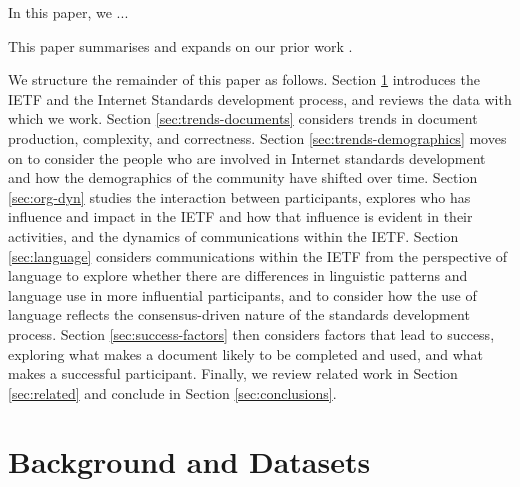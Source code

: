 \documentclass[twocolumn,10pt]{article}
\begin{document}
In this paper, we ...



This paper summarises and expands on our prior work
\cite{mcquistin:2021:characterising,khare:2022:web-we-weave,
healey:2023:power,mcquistin:2023:errare,khare:2023:tracing,
karan:2023:leda,healey:2023:power-frontiers,barnes:2024:temporal}.


We structure the remainder of this paper as follows.
Section \ref{sec:background} introduces the IETF and the Internet Standards
development process, and reviews the data with which we work.
Section \ref{sec:trends-documents} considers trends in document production,
complexity, and correctness.
Section \ref{sec:trends-demographics} moves on to consider the people who
are involved in Internet standards development and how the demographics of
the community have shifted over time.
Section \ref{sec:org-dyn} studies the interaction between participants,
explores who has influence and impact in the IETF and how that influence
is evident in their activities, and the dynamics of communications within
the IETF.
Section \ref{sec:language} considers communications within the IETF from
the perspective of language to explore whether there are differences in
linguistic patterns and language use in more influential participants,
and to consider how the use of language reflects the consensus-driven
nature of the standards development process.
Section \ref{sec:success-factors} then considers factors that lead to
success, exploring what makes a document likely to be completed and
used, and what makes a successful participant.
Finally, we review related work in Section \ref{sec:related} and conclude
in Section \ref{sec:conclusions}.

\section{Background and Datasets}
\label{sec:background}
\end{document}
